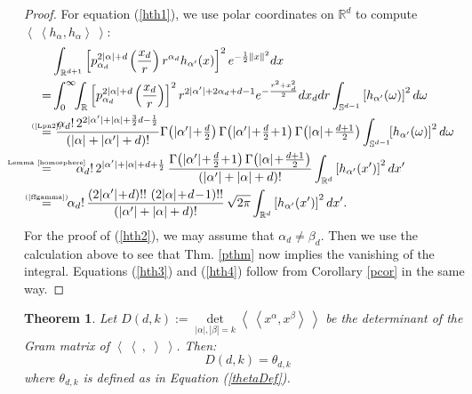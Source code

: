\documentclass{amsart}
\newcommand{\p}[2]{p_{#1}^{#2}\;\!\!}
\newcommand{\bra}{\left<\!\!\!\:\left<}
\newcommand{\ket}{\right>\!\!\!\:\right>}
\newcommand{\myeq}[1]{\mathrel{\overset{\makebox[0pt]{\text{\tiny #1}}}{=}}}
\newcommand{\R}{\mathbb{R}}
\renewcommand{\S}{\mathbb{S}}
\theoremstyle{plain}
\newtheorem{theorem}{Theorem}[section]
\theoremstyle{definition}
\theoremstyle{remark}
\begin{document}
\begin{proof}
For equation (\ref{hth1}), we use polar coordinates on $\R ^d$ to compute $\bra h_\alpha ,h_\alpha \ket$:
\begin{align*}
 &\int_{\R^{d+1}}\left[\p{\alpha_d}{2|\alpha|+d}\left(\frac{x_d}{r}\right) r^{\alpha_d}h_{\alpha'}(x)\right]^2 e^{-\frac{1}{2}\|x\|^2} dx \\
 = & \int_0^\infty\!\!\int_{\R} \left[\p{\alpha_d}{2|\alpha|+d}\left(\frac{x_d}{r}\right)\right]^2 r^{2|\alpha'|+2\alpha_d+d-1} e^{-\frac{r^2+x_d^2}{2} }dx_ddr\int_{\S^{d-1}}\left[h_{\alpha'}(\omega)\right]^2 d\omega \\
\myeq{(\ref{Lpn2})}& \  \frac{\alpha_d!\, 2^{2|\alpha '|+|\alpha|+\frac{3}{2}d-\frac{1}{2}} }{\left(|\alpha|+|\alpha'|+d\right)!} { \textstyle
\Gamma\!\left( |\alpha'| \!+\!\frac{d}{2}\right)\Gamma\!\left( |\alpha'|\!+\! \frac{d}{2}\!+\! 1\right) \Gamma\!\left( |\alpha| \!+\! \frac{d+1}{2}\right) }\int_{\S^{d-1}}\!\!\left[h_{\alpha'}(\omega)\right]^2 d\omega \\
\myeq{Lemma~\ref{homosphere}}&\quad\quad \alpha_d!\,2^{|\alpha '|+|\alpha |+d+\frac{1}{2}}\,
\frac{\Gamma\!\left(|\alpha '|\!+\!\frac{d}{2}\!+\!1\right)\Gamma\!\left(|\alpha |\!+\!\tfrac{d+1}{2}\right)}{\left(|\alpha '|+|\alpha |+d\right)!} \int_{\R^d} \left[h_{\alpha'}(x')\right]^2 dx' \\
\myeq{(\ref{ffgamma})}& \quad\; 
\alpha_d!\,\frac{\left(2|\alpha '|\!+\!d\right)!!\,\left(2|\alpha |\!+\!d\!-\!1\right)!!}{\left(|\alpha '|+|\alpha |+d\right)!}\, \sqrt{2\pi}\int_{\R^d} \left[h_{\alpha'}(x')\right]^2 dx' .
\end{align*}
For the proof of (\ref{hth2}), we may assume that $\alpha_d \neq \beta_d$. Then we use the calculation above to see that Thm. \ref{pthm} now implies the vanishing of the integral. Equations (\ref{hth3}) and (\ref{hth4}) follow from Corollary \ref{pcor} in the same way.
\end{proof}
\begin{theorem}\label{thetaCor} Let $D(d,k):=\det\limits_{|\alpha|,|\beta|=k}\bra x^\alpha ,x^\beta \ket $ be the determinant of the Gram matrix of $\bra\ ,\;\ket$. Then:
$$
D(d,k) = \theta_{d,k}
$$
where $\theta_{d,k}$ is defined as in Equation (\ref{thetaDef}).
\end{theorem}
\end{document}
